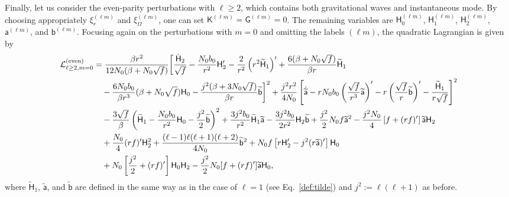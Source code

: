 \documentclass[aps,prd,preprintnumbers,superscriptaddress,nofootinbib,notitlepage]{revtex4-2}
\begin{document}
Finally, let us consider the even-parity perturbations with $\ell\ge 2$, which contains both gravitational waves and instantaneous mode.
By choosing appropriately $\xi_r^{(\ell m)}$ and $\xi_\Omega^{(\ell m)}$, one can set $\mathsf{K}^{(\ell m)}=\mathsf{G}^{(\ell m)}=0$.
The remaining variables are
$\mathsf{H}_0^{(\ell m)}$, $\mathsf{H}_1^{(\ell m)}$, $\mathsf{H}_2^{(\ell m)}$, $\mathsf{a}^{(\ell m)}$, and $\mathsf{b}^{(\ell m)}$.
Focusing again on the perturbations with $m=0$ and omitting the labels $(\ell m)$, the quadratic Lagrangian is given by
\begin{align}
{\cal L}_{\ell\ge 2,m=0}^{(\textrm{even})}&=\frac{\beta r^2}{12N_0(\beta+N_0\sqrt{f})}
\biggl[\frac{\dot{\mathsf{H}}_2}{\sqrt{f}}
-\frac{N_0b_0}{r^2}\mathsf{H}_2'-\frac{2}{r^2}\left(r^2\widetilde{\mathsf{H}}_1\right)'
+\frac{6(\beta+N_0\sqrt{f})}{\beta r}\widetilde{\mathsf{H}}_1
\notag \\ &\quad
-\frac{6N_0b_0}{\beta r^3}(\beta+N_0\sqrt{f})\mathsf{H}_0
-\frac{j^2(\beta+3N_0\sqrt{f})}{\beta r}\widetilde{\mathsf{b}}
\biggr]^2
+\frac{j^2r^2}{4N_0}\left[
\dot{\widetilde{\mathsf{a}}}-rN_0b_0\left(\frac{\sqrt{f}}{r^3}\widetilde{\mathsf{a}}\right)'
-r\left(\frac{\sqrt{f}}{r}\widetilde{\mathsf{b}}\right)'
-\frac{\widetilde{\mathsf{H}}_1}{r\sqrt{f}}
\right]^2
\notag \\ &\quad
-\frac{3\sqrt{f}}{\beta}\left(\widetilde{\mathsf{H}}_1
-\frac{N_0b_0}{r^2}\mathsf{H}_0
-\frac{j^2}{2}
\widetilde{\mathsf{b}}\right)^2
+\frac{3j^2b_0}{r^2}\widetilde{\mathsf{H}}_1\widetilde{\mathsf{a}}
-\frac{3j^2b_0}{2r^2}\mathsf{H}_2\widetilde{\mathsf{b}}
+\frac{j^2}{2}N_0f\widetilde{\mathsf{a}}^2-\frac{j^2N_0}{4}\left[f+(rf)'\right]
\widetilde{\mathsf{a}}\mathsf{H}_2
\notag \\ &\quad
+\frac{N_0}{4}(rf)'\mathsf{H}_2^2
+\frac{(\ell-1)\ell(\ell+1)(\ell+2)}{4N_0}\widetilde{\mathsf{b}}^2+
N_0f\left[
r\mathsf{H}_2'-j^2(r\widetilde{\mathsf{a}})'
\right]\mathsf{H}_0
\notag \\ & \quad
+N_0\left[\frac{j^2}{2}+(rf)'\right]\mathsf{H}_0\mathsf{H}_2
-\frac{j^2}{2}N_0[f+(rf)']\widetilde{\mathsf{a}}\mathsf{H}_0,\label{Lag:ell-2}
\end{align}
where $\widetilde{\mathsf{H}}_1$, $\widetilde{\mathsf{a}}$, and $\widetilde{\mathsf{b}}$ are defined in the same way as in the case of $\ell=1$ (see Eq.~\eqref{def:tilde}) and $j^2:=\ell(\ell+1)$ as before.
\end{document}
